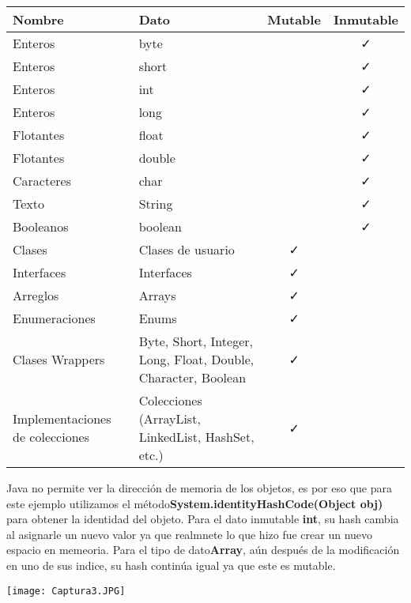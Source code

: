 \documentclass{article}
\begin{document}
\begin{table}[htbp]
    \centering
    \begin{tabular}{|p{3cm}|p{5cm}|c|c|}
    \hline
    \textbf{Nombre} & \textbf{Dato} & \textbf{Mutable} & \textbf{Inmutable} \\
    \hline
    Enteros & byte &  & \faCheck \\
Enteros & short &  & \faCheck \\
Enteros & int &  & \faCheck \\
Enteros & long &  & \faCheck \\
Flotantes & float &  & \faCheck \\
Flotantes & double &  & \faCheck \\
Caracteres & char &  & \faCheck \\
Texto & String &  & \faCheck \\
Booleanos & boolean &  & \faCheck \\
Clases & Clases de usuario & \faCheck & \\
Interfaces & Interfaces & \faCheck & \\
Arreglos & Arrays & \faCheck & \\
Enumeraciones & Enums & \faCheck & \\
Clases Wrappers & Byte, Short, Integer, Long, Float, Double, Character, Boolean & \faCheck & \\
Implementaciones de colecciones & Colecciones (ArrayList, LinkedList, HashSet, etc.) & \faCheck & \\
    \hline
    \end{tabular}
    \label{tab:ejemplo}
\end{table}

        Java no permite ver la dirección de memoria de los objetos, es por eso que para este ejemplo utilizamos el método\textbf{System.identityHashCode(Object obj)} para obtener la identidad del objeto. Para el dato inmutable \textbf{int}, su hash cambia al asignarle un nuevo valor ya que realmnete lo que hizo fue crear un nuevo espacio en memeoria. Para el tipo de dato\textbf{Array}, aún después de la modificación en uno de sus indice, su hash continúa igual ya que este es mutable.

        \texttt{[image: Captura3.JPG]}
\newpage
\end{document}
